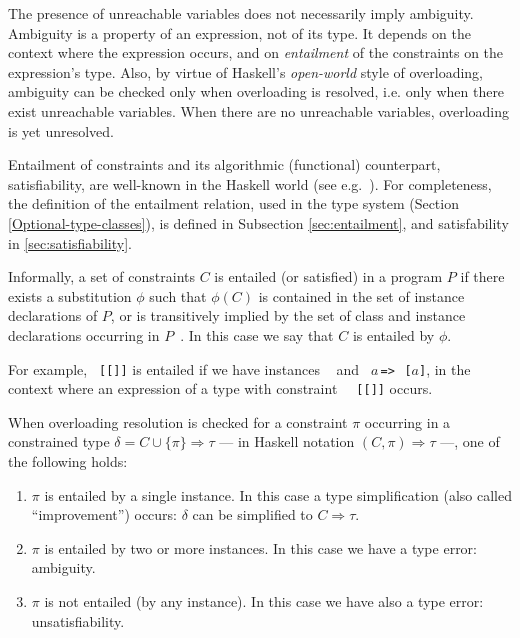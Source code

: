 The presence of unreachable variables does not necessarily imply
ambiguity. Ambiguity is a property of an expression, not of its
type. It depends on the context where the expression occurs, and on
\textit{entailment\/} of the constraints on the expression's type.
Also, by virtue of Haskell's {\em open-world\/} style of overloading,
ambiguity can be checked only when overloading is resolved, i.e. only
when there exist unreachable variables. When there are no unreachable
variables, overloading is yet unresolved.


Entailment of constraints and its algorithmic (functional)
counterpart, satisfiability, are well-known in the Haskell world (see
e.g.~\cite{MarkJones94a,TheoryOfOverloading,JBCS-Ambiguity-and-constrained-polymorphism}).
For completeness, the definition of the entailment relation, used in
the type system (Section \ref{Optional-type-classes}), is defined in
Subsection \ref{sec:entailment}, and satisfability in 
\ref{sec:satisfiability}.

Informally, a set of constraints $C$ is entailed (or satisfied) in a
program $P$ if there exists a substitution $\phi$ such that $\phi(C)$
is contained in the set of instance declarations of $P$, or is
transitively implied by the set of class and instance declarations
occurring in
$P$~\cite{MarkJones94a,JBCS-Ambiguity-and-constrained-polymorphism}. In
this case we say that $C$ is entailed by $\phi$.

For example, {\tt \Eq\ [[\Integer]]} is entailed if we have instances
{\tt \Eq\ \Integer} and {\tt \Eq\ $a\,$=>$\,$\Eq\ [$a$]}, in the
context where an expression of a type with constraint {\tt
  \Eq\ [[\Integer]]} occurs.

When overloading resolution is checked for a constraint $\pi$
occurring in a constrained type $\delta = C \cup \{ \pi \} \Rightarrow
\tau$ --- in Haskell notation $(C, \pi) \Rightarrow \tau$ ---, one of
the following holds:
\begin{enumerate}

\item $\pi$ is entailed by a single instance. In this case a type
  simplification (also called ``improvement'') occurs: $\delta$ can be
  simplified to $C \Rightarrow \tau$.

\item $\pi$ is entailed by two or more instances. In this case we have
  a type error: ambiguity.

\item $\pi$ is not entailed (by any instance). In this case we have also
  a type error: unsatisfiability.

\end{enumerate}

